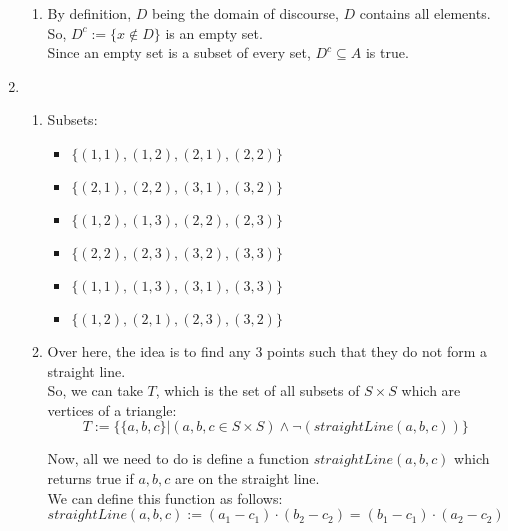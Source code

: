 \documentclass[a4paper]{article}
\begin{document}
\begin{enumerate}
\begin{enumerate}
        \item By definition, $D$ being the domain of discourse, $D$ contains all elements.\\
        So, $D^c := \{x \notin D\}$ is an empty set.\\
        Since an empty set is a subset of every set, $D^c \subseteq A$ is true.\\
    \end{enumerate}

    \newpage
    \item \begin{enumerate}
        \item Subsets:
        \begin{itemize}
            \item $\{(1, 1), (1, 2), (2, 1), (2, 2)\}$
            \item $\{(2, 1), (2, 2), (3, 1), (3, 2)\}$
            \item $\{(1, 2), (1, 3), (2, 2), (2, 3)\}$
            \item $\{(2, 2), (2, 3), (3, 2), (3, 3)\}$
            \item $\{(1, 1), (1, 3), (3, 1), (3, 3)\}$
            \item $\{(1, 2), (2, 1), (2, 3), (3, 2)\}$ \\
        \end{itemize}

        \item Over here, the idea is to find any 3 points such that they do not form a straight line. \\

        So, we can take $T$, which is the set of all subsets of $S \times S$ which are vertices of a triangle:
        \[T := \{ \{a, b, c\}| (a, b, c \in S \times S) \land \neg(straightLine(a, b, c)) \}\]

        Now, all we need to do is define a function $straightLine(a, b, c)$ which returns true if $a, b, c$ are on the straight line.\\

        We can define this function as follows:
        \[straightLine(a, b, c) := (a_1 - c_1) \cdot (b_2 - c_2) = (b_1 - c_1) \cdot (a_2 - c_2)\]


\end{enumerate}
\end{enumerate}
\end{document}
